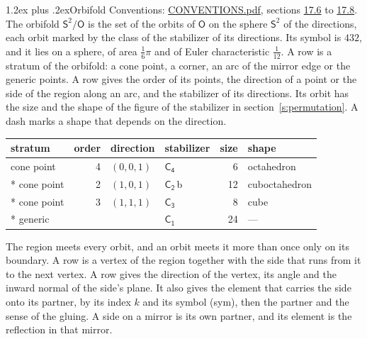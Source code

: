\documentclass[10pt,a4paper]{article}
\makeatletter
\renewcommand\section{\@startsection{section}{1}{\z@}{-3ex plus -1ex minus -.2ex}%
  {1.2ex plus .2ex}{\normalfont\large\sffamily\bfseries\color{parttitle}}}
\numberwithin{equation}{section}
\newcommand{\grp}[1]{\mathsf{#1}}
\newcommand{\orbname}[1]{#1}
\newcommand{\clsletter}[1]{\,{\scriptsize\color{black!55}#1}}
\newcommand{\dirvec}[3]{(#1, #2, #3)}
\newcommand{\twosphere}{\mathsf{S}^{2}}
\makeatother
\begin{document}
\section{Orbifold}\label{s:orbifold}
Conventions: \href{../../CONVENTIONS.pdf}{CONVENTIONS.pdf}, sections \href{../../CONVENTIONS.pdf\#conv.17.6}{17.6} to \href{../../CONVENTIONS.pdf\#conv.17.8}{17.8}.
The orbifold $\twosphere/\grp{O}$ is the set of the orbits of $\grp{O}$ on the sphere $\twosphere$ of the directions, each orbit marked by the class of the stabilizer of its directions. Its symbol is $\orbname{432}$, and it lies on a sphere, of area $\tfrac{1}{6}\pi$ and of Euler characteristic $\tfrac{1}{12}$.
\leavevmode\label{n:head.stratum}\label{n:head.order.point}\label{n:head.direction}\label{n:head.stabilizer}\label{n:head.size.orbit}\label{n:head.shape}A row is a stratum of the orbifold: a cone point, a corner, an arc of the mirror edge or the generic points. A row gives the order of its points, the direction of a point or the side of the region along an arc, and the stabilizer of its directions. Its orbit has the size and the shape of the figure of the stabilizer in section~\ref{s:permutation}. A dash marks a shape that depends on the direction.
{\small\setlength{\tabcolsep}{4pt}\begin{longtable}{@{}lrllrl@{}}\toprule
stratum & order & direction & stabilizer & size & shape\\\midrule\endhead
\bottomrule\endfoot\endlastfoot
cone point & 4 & $\dirvec{0}{0}{1}$ & \href{C4.pdf}{$\grp{C_{4}}$} & 6 & octahedron\\*
cone point & 2 & $\dirvec{1}{0}{1}$ & \href{C2.pdf}{$\grp{C_{2}}$}\clsletter{b} & 12 & cuboctahedron\\*
cone point & 3 & $\dirvec{1}{1}{1}$ & \href{C3.pdf}{$\grp{C_{3}}$} & 8 & cube\\*
generic &  &  & \href{C1.pdf}{$\grp{C_{1}}$} & 24 & ---\\
\bottomrule\end{longtable}}
\leavevmode\label{n:head.vertex.region}\label{n:head.angle}\label{n:head.normal.side}\label{n:head.partner}\label{n:head.sense}The region meets every orbit, and an orbit meets it more than once only on its boundary. A row is a vertex of the region together with the side that runs from it to the next vertex. A row gives the direction of the vertex, its angle and the inward normal of the side's plane. It also gives the element that carries the side onto its partner, by its index $k$ and its symbol (sym), then the partner and the sense of the gluing. A side on a mirror is its own partner, and its element is the reflection in that mirror.
\end{document}
